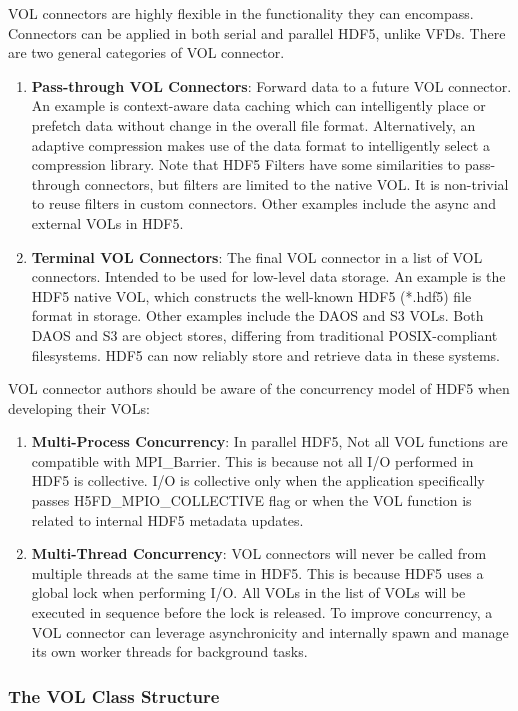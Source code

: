 VOL connectors are highly flexible in the functionality they can encompass. Connectors can be applied in both serial and parallel HDF5, unlike VFDs. There are two general categories of VOL connector.
\begin{enumerate}
    \item \textbf{Pass-through VOL Connectors}: Forward data to a future VOL connector. An example is context-aware data caching which can intelligently place or prefetch data without change in the overall file format. Alternatively, an adaptive compression makes use of the data format to intelligently select a compression library. Note that HDF5 Filters have some similarities to pass-through connectors, but filters are limited to the native VOL. It is non-trivial to reuse filters in custom connectors. Other examples include the async and external VOLs in HDF5.
    \item \textbf{Terminal VOL Connectors}: The final VOL connector in a list of VOL connectors. Intended to be used for low-level data storage. An example is the HDF5 native VOL, which constructs the well-known HDF5 (*.hdf5) file format in storage. Other examples include the DAOS and S3 VOLs. Both DAOS and S3 are object stores, differing from traditional POSIX-compliant filesystems. HDF5 can now reliably store and retrieve data in these systems.
\end{enumerate}

VOL connector authors should be aware of the concurrency model of HDF5 when developing their VOLs:
\begin{enumerate}
    \item \textbf{Multi-Process Concurrency}: In parallel HDF5, Not all VOL functions are compatible with MPI\_Barrier. This is because not all I/O performed in HDF5 is collective. I/O is collective only when the application specifically passes H5FD\_MPIO\_COLLECTIVE flag or when the VOL function is related to internal HDF5 metadata updates.
    \item \textbf{Multi-Thread Concurrency}: VOL connectors will never be called from multiple threads at the same time in HDF5. This is because HDF5 uses a global lock when performing I/O. All VOLs in the list of VOLs will be executed in sequence before the lock is released. To improve concurrency, a VOL connector can leverage asynchronicity and internally spawn and manage its own worker threads for background tasks.
\end{enumerate}

\subsubsection{The VOL Class Structure}

